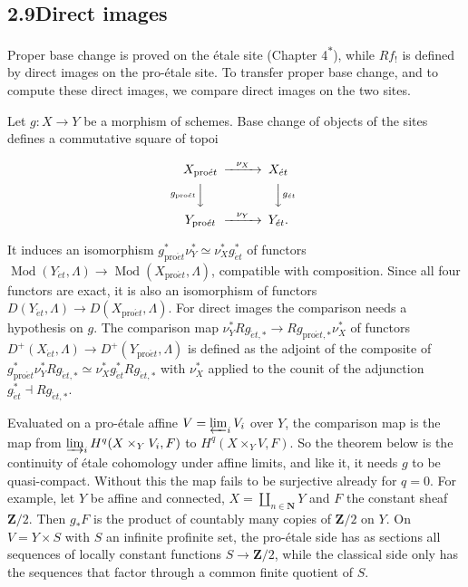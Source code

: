 \documentclass[11pt]{article}
\newcommand{\bpout}[1]{#1\textsuperscript{\hyperlink{bp-outside}{\ensuremath{\ast}}}}
\begin{document}
\subsection*{\texorpdfstring{2.9\quad Direct images}{2.9 Direct images}}
\label{bp109}%
\label{bp110}%
Proper base change is proved on the étale site (Chapter \bpout{4}), while \(Rf_!\) is defined by direct images on the pro-étale site. To transfer proper base change, and to compute these direct images, we compare direct images on the two sites.

Let \(g:X\to Y\) be a morphism of schemes. Base change of objects of the sites defines a commutative square of topoi

\[
\begin{CD}
X_{\mathrm{pro}\acute{e}t}@>{\nu_X}>>X_{\acute{e}t}\\
@V{g_{\mathrm{pro}\acute{e}t}}VV @VV{g_{\acute{e}t}}V\\
Y_{\mathrm{pro}\acute{e}t}@>{\nu_Y}>>Y_{\acute{e}t}.
\end{CD}
\]

It induces an isomorphism \(g_{\mathrm{pro}\acute{e}t}^*\nu_Y^*\simeq\nu_X^*g_{\acute{e}t}^*\) of functors \(\operatorname{Mod}(Y_{\acute{e}t},\Lambda)\to\operatorname{Mod}(X_{\mathrm{pro}\acute{e}t},\Lambda)\), compatible with composition. Since all four functors are exact, it is also an isomorphism of functors \(D(Y_{\acute{e}t},\Lambda)\to D(X_{\mathrm{pro}\acute{e}t},\Lambda)\). For direct images the comparison needs a hypothesis on \(g\). The comparison map \(\nu_Y^*Rg_{\acute{e}t,*}\to Rg_{\mathrm{pro}\acute{e}t,*}\nu_X^*\) of functors \(D^+(X_{\acute{e}t},\Lambda)\to D^+(Y_{\mathrm{pro}\acute{e}t},\Lambda)\) is defined as the adjoint of the composite of \(g_{\mathrm{pro}\acute{e}t}^*\nu_Y^*Rg_{\acute{e}t,*}\simeq\nu_X^*g_{\acute{e}t}^*Rg_{\acute{e}t,*}\) with \(\nu_X^*\) applied to the counit of the adjunction \(g_{\acute{e}t}^*\dashv Rg_{\acute{e}t,*}\).

Evaluated on a pro-étale affine \(V=\varprojlim_iV_i\) over \(Y\), the comparison map is the map from \(\varinjlim_iH^q(X\times_YV_i,F)\) to \(H^q(X\times_YV,F)\). So the theorem below is the continuity of étale cohomology under affine limits, and like it, it needs \(g\) to be quasi-compact. Without this the map fails to be surjective already for \(q=0\). For example, let \(Y\) be affine and connected, \(X=\coprod_{n\in\mathbf N}Y\) and \(F\) the constant sheaf \(\mathbf Z/2\). Then \(g_*F\) is the product of countably many copies of \(\mathbf Z/2\) on \(Y\). On \(V=Y\times S\) with \(S\) an infinite profinite set, the pro-étale side has as sections all sequences of locally constant functions \(S\to\mathbf Z/2\), while the classical side only has the sequences that factor through a common finite quotient of \(S\).
\end{document}
